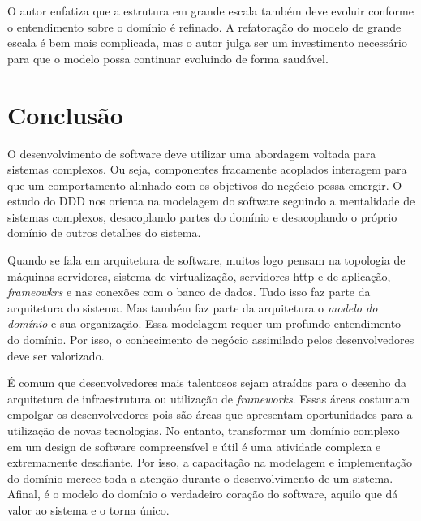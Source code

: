 \documentclass[a4paper, 12pt]{article}
\begin{document}
O autor enfatiza que a estrutura em grande escala também deve evoluir conforme o entendimento sobre o domínio é refinado. A refatoração do modelo de grande escala é bem mais complicada, mas o autor julga ser um investimento necessário para que o modelo possa continuar evoluindo de forma saudável.

\section{Conclusão}

O desenvolvimento de software deve utilizar uma abordagem voltada para sistemas complexos. Ou seja, componentes fracamente acoplados interagem para que um comportamento alinhado com os objetivos do negócio possa emergir. O estudo do DDD nos orienta na modelagem do software seguindo a mentalidade de sistemas complexos, desacoplando partes do domínio e desacoplando o próprio domínio de outros detalhes do sistema. 

Quando se fala em arquitetura de software, muitos logo pensam na topologia de máquinas servidores, sistema de virtualização, servidores http e de aplicação, \emph{frameowkrs} e nas conexões com o banco de dados. Tudo isso faz parte da arquitetura do sistema. Mas também faz parte da arquitetura o \emph{modelo do domínio} e sua organização. Essa modelagem requer um profundo entendimento do domínio. Por isso, o conhecimento de negócio assimilado pelos desenvolvedores deve ser valorizado.

É comum que desenvolvedores mais talentosos sejam atraídos para o desenho da arquitetura de infraestrutura ou utilização de \emph{frameworks}. Essas áreas costumam empolgar os desenvolvedores pois são áreas que apresentam oportunidades para a utilização de novas tecnologias. No entanto, transformar  um domínio complexo em um design de software compreensível e útil é uma atividade complexa e extremamente desafiante. Por isso, a capacitação na modelagem e implementação do domínio merece toda a atenção durante o desenvolvimento de um sistema. Afinal, é o modelo do domínio o verdadeiro coração do software, aquilo que dá valor ao sistema e o torna único.

\small


  
\end{document}
